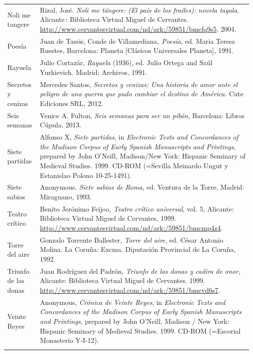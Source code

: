 \documentclass[output=paper]{langscibook}
\begin{document}
\begin{tabularx}{\textwidth}{XX}
Noli me tangere & Rizal, José. \textit{Noli me tángere: (El país de los frailes): novela tagala}. Alicante : Biblioteca Virtual Miguel de Cervantes. \url{http://www.cervantesvirtual.com/nd/ark:/59851/bmcfq9s5}. 2004.\\
Poesía & Juan de Tassis, Conde de Villamediana\textit{, Poesía}, ed. Maria Teresa Ruestes, Barcelona: Planeta [Clásicos Universales Planeta], 1991.\\
Rayuela & Julio Cortazár, \textit{Rayuela} (1936), ed. Julio Ortega and Saúl Yurkievich. Madrid: Archivos, 1991.\\
Secretos y cenizas & Mercedes Santos, \textit{Secretos y cenizas: Una historia de amor ante el peligro de una guerra que pudo cambiar el destino de América.} Cute Ediciones SRL, 2012.\\
Seis semanas  & Venice A. Fulton, \textit{Seis semanas para ser un pibón}, Barcelona: Libros Cúpula. 2013.\\
Siete partidas & Alfonso X, \textit{Siete partidas}, in \textit{Electronic Texts and Concordances of the Madison Corpus of Early Spanish Manuscripts and Printings}, prepared by John O’Neill, Madison/New York: Hispanic Seminary of Medieval Studies. 1999. CD-ROM (=Sevilla Meinardo Ungut y Estanislao Polono 10-25-1491).\\
Siete sabios & Anonymous. \textit{Siete sabios de Roma}, ed. Ventura de la Torre, Madrid: Miraguano, 1993.\\
Teatro crítico  & Benito Jerónimo Feijoo, \textit{Teatro crítico universal}, vol. 5, Alicante: Biblioteca Virtual Miguel de Cervantes, 1999. \url{http://www.cervantesvirtual.com/nd/ark:/59851/bmcmp4z4}.\\
Torre del aire & Gonzalo Torrente Ballester, \textit{Torre del aire}, ed. César Antonio Molina. La Coruña: Excma. Diputación Provincial de La Coruña, 1992.\\
Triunfo de las donas & Juan Rodríguez del Padrón, \textit{Triunfo de las donas y cadira de onor}, Alicante: Biblioteca Virtual Miguel de Cervantes. 1999. \url{http://www.cervantesvirtual.com/nd/ark:/59851/bmcvd6s7}.\\
Veinte Reyes & Anonymous, \textit{Crónica de Veinte Reyes}, in \textit{Electronic Texts and Concordances of the Madison Corpus of Early Spanish Manuscripts and Printings}, prepared by John O’Neill. Madison / New York: Hispanic Seminary of Medieval Studies. 1999. CD-ROM (=Escorial Monasterio Y-I-12).\\
\lspbottomrule
\end{tabularx}
\end{document}
